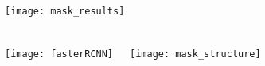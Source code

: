 

% 






\subsection{}
\begin{frame}
  \frametitle{}
  \centering
  \texttt{[image: mask\_results]}
\end{frame}

\begin{frame}
  \frametitle{}
\begin{columns}
  \texttt{[image: fasterRCNN]}
  \centering
  \\

  \centering
  \texttt{[image: mask\_structure]}
  \\

\end{columns}
\end{frame}


